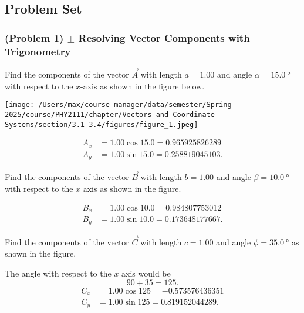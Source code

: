 
\subsection{Problem Set}

\subsubsection{(Problem 1) $\pm$ Resolving Vector Components with Trigonometry}

\problempart

Find the components of the vector $\vec{A}$ with length $a=1.00$ and angle $\alpha=\SI{15.0}{\degree}$ with respect to the $x$-axis as shown in the figure below.

\begin{center}
	\texttt{[image: /Users/max/course-manager/data/semester/Spring 2025/course/PHY2111/chapter/Vectors and Coordinate Systems/section/3.1-3.4/figures/figure\_1.jpeg]}
\end{center}

\begin{solution}
	\begin{align*}
		A_{x} &= 1.00 \cos 15.0 = 0.965925826289 \\
		A_{y} &= 1.00 \sin 15.0 = 0.258819045103
		.\end{align*}
\end{solution}

\problempart

Find the components of the vector $\vec{B}$ with length $b=1.00$ and angle $\beta = \SI{10.0}{\degree}$ with respect to the $x$ axis as shown in the figure.

\begin{solution}
	\begin{align*}
		B_{x} &= 1.00 \cos 10.0 = 0.984807753012 \\
		B_{y} &= 1.00 \sin 10.0 = 0.173648177667
		.\end{align*}
\end{solution}

\problempart

Find the components of the vector $\vec{C}$ with length $c=1.00$ and angle $\phi = \SI{35.0}{\degree}$ as shown in the figure.

\begin{solution}
	The angle with respect to the $x$ axis would be
	\[
		90 + 35 = 125
		.\]
	\begin{align*}
		C_{x} &= 1.00 \cos 125 = -0.573576436351 \\
		C_{y} &= 1.00 \sin 125 = 0.819152044289
		.\end{align*}
\end{solution}

